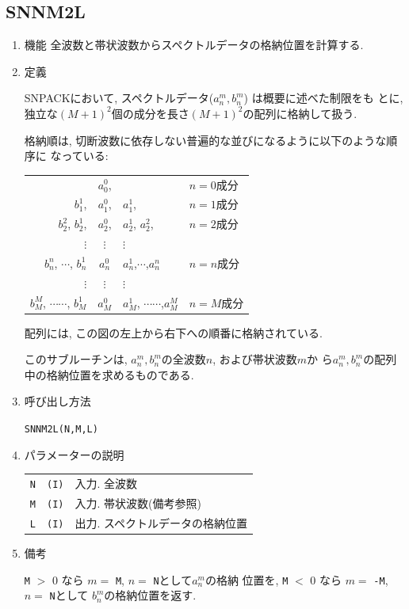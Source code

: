 \documentclass[a4j,fleqn]{jarticle}
\begin{document}
\subsection{SNNM2L}

\begin{enumerate}

\item 機能 
全波数と帯状波数からスペクトルデータの格納位置を計算する.

\item 定義

SNPACKにおいて, スペクトルデータ($a^m_n, b^m_n$)
は概要に述べた制限をも
とに, 独立な$(M+1)^2$個の成分を長さ$(M+1)^2$の配列に格納して扱う.

格納順は, 切断波数に依存しない普遍的な並びになるように以下のような順序に
なっている:
\begin{center}
\begin{tabular}{rcll}
                  & $a^0_0$, &                      & $n=0$成分\\
         $b^1_1$, & $a^0_1$, & $a^1_1$,             & $n=1$成分\\
$b^2_2$, $b^1_2$, & $a^0_2$, & $a^1_2$, $a^2_2$,    & $n=2$成分\\
 $\vdots$         &  $\vdots$ &   $\vdots$          &  \\     
$b^n_n$, $\cdots$, $b^1_n$ & $a^0_n$ & $a^1_n$,$\cdots$,$a^n_n$ & $n=n$成分 \\
 $\vdots$         &  $\vdots$ &   $\vdots$                      &  \\
$b^M_M$, $\cdots\cdots$, $b^1_M$ & $a^0_M$ & 
             $a^1_M$, $\cdots\cdots$,$a^M_M$ & $n=M$成分
\end{tabular}
\end{center}
配列には, この図の左上から右下への順番に格納されている.

このサブルーチンは, $a^m_n, b^m_n$の全波数$n$, および帯状波数$m$か
ら$a^m_n, b^m_n$の配列中の格納位置を求めるものである.

\item 呼び出し方法 
    
{\tt SNNM2L(N,M,L)}
  
\item パラメーターの説明 

\begin{tabular}{lll}
{\tt N} & {\tt (I)} & 入力. 全波数\\
{\tt M} & {\tt (I)} & 入力. 帯状波数(備考参照)\\
{\tt L} & {\tt (I)} & 出力. スペクトルデータの格納位置
\end{tabular}

\item 備考

{\tt M} $>$ 0 なら $m=$ {\tt M}, $n=$ {\tt N}として$a^m_n$の格納
位置を, {\tt M} $<$ 0 なら $m=$ {\tt -M}, $n=$ {\tt N}として
$b^m_n$の格納位置を返す.

\end{enumerate}
\end{document}
